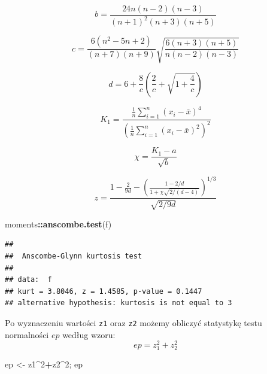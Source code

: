\documentclass[polish,]{book}
\newenvironment{Shaded}{\begin{snugshade}}{\end{snugshade}}
\newcommand{\DecValTok}[1]{\textcolor[rgb]{0.00,0.00,0.81}{#1}}
\newcommand{\KeywordTok}[1]{\textcolor[rgb]{0.13,0.29,0.53}{\textbf{#1}}}
\newcommand{\NormalTok}[1]{#1}
\newcommand{\OperatorTok}[1]{\textcolor[rgb]{0.81,0.36,0.00}{\textbf{#1}}}
\newcommand{\StringTok}[1]{\textcolor[rgb]{0.31,0.60,0.02}{#1}}
\begin{document}
\begin{equation}
b=\frac{24n(n-2)(n-3)}{(n+1)^2(n+3)(n+5)}
\label{eq:wz1117}
\end{equation}

\begin{equation}
c=\frac{6(n^2-5n+2)}{(n+7)(n+9)}\sqrt{\frac{6(n+3)(n+5)}{n(n-2)(n-3)}}
\label{eq:wz1118}
\end{equation}

\begin{equation}
d=6+\frac{8}{c}\left(\frac{2}{c}+\sqrt{1+\frac{4}{c}}\right)
\label{eq:wz1119}
\end{equation}

\begin{equation}
K_1=\frac{\frac{1}{n}\sum_{i=1}^{n}(x_i-\bar{x})^4}{\left(\frac{1}{n}\sum_{i=1}^{n}(x_i-\bar{x})^2\right)^2}
\label{eq:wz1120}
\end{equation}

\begin{equation}
\chi=\frac{K_1-a}{\sqrt{b}}
\label{eq:wz1121}
\end{equation}

\begin{equation}
z=\frac{1-\frac{2}{9d}-\left(\frac{1-2/d}{1+\chi\sqrt{2/(d-4)}}\right)^{1/3}}{\sqrt{2/9d}}
\label{eq:wz1122}
\end{equation}

\begin{Shaded}
\begin{Highlighting}[]
\NormalTok{moments}\OperatorTok{::}\KeywordTok{anscombe.test}\NormalTok{(f)}
\end{Highlighting}
\end{Shaded}

\begin{verbatim}
## 
##  Anscombe-Glynn kurtosis test
## 
## data:  f
## kurt = 3.8046, z = 1.4585, p-value = 0.1447
## alternative hypothesis: kurtosis is not equal to 3
\end{verbatim}

Po wyznaczeniu wartości \texttt{z1} oraz \texttt{z2} możemy obliczyć statystykę testu normalności \(ep\) według wzoru:
\begin{equation}
ep=z_1^2+z_2^2
\label{eq:wz1123}
\end{equation}

\begin{Shaded}
\begin{Highlighting}[]
\NormalTok{ep <-}\StringTok{ }\NormalTok{z1}\OperatorTok{^}\DecValTok{2}\OperatorTok{+}\NormalTok{z2}\OperatorTok{^}\DecValTok{2}\NormalTok{; ep}
\end{Highlighting}
\end{Shaded}
\end{document}
